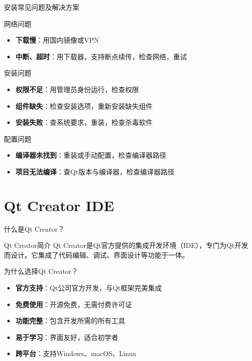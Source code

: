 \documentclass[UTF8,aspectratio=169]{beamer}
\begin{document}
\begin{frame}{安装常见问题及解决方案}
    \begin{ytualertblock}{网络问题}
        \begin{itemize}
            \item \textbf{下载慢}：用国内镜像或VPN
            \item \textbf{中断、超时}：用下载器，支持断点续传，检查网络，重试
        \end{itemize}
    \end{ytualertblock}
    \begin{ytualertblock}{安装问题}
        \begin{itemize}
            \item \textbf{权限不足}：用管理员身份运行，检查权限
            \item \textbf{组件缺失}：检查安装选项，重新安装缺失组件
            \item \textbf{安装失败}：查系统要求，重装，检查杀毒软件
        \end{itemize}
    \end{ytualertblock}
    \begin{ytualertblock}{配置问题}
        \begin{itemize}
            \item \textbf{编译器未找到}：重装或手动配置，检查编译器路径
            \item \textbf{项目无法编译}：查Qt版本与编译器，检查编译器路径
        \end{itemize}
    \end{ytualertblock}
\end{frame}

\section{Qt Creator IDE}

\begin{frame}{什么是Qt Creator？}
    \begin{ytublock}{Qt Creator简介}
        Qt Creator是Qt官方提供的集成开发环境（IDE），专门为Qt开发而设计。它集成了代码编辑、调试、界面设计等功能于一体。
    \end{ytublock}

    \begin{ytublock}{为什么选择Qt Creator？}
        \begin{itemize}
            \item \textbf{官方支持}：Qt公司官方开发，与Qt框架完美集成
            \item \textbf{免费使用}：开源免费，无需付费许可证
            \item \textbf{功能完整}：包含开发所需的所有工具
            \item \textbf{易于学习}：界面友好，适合初学者
            \item \textbf{跨平台}：支持Windows、macOS、Linux
        \end{itemize}
    \end{ytublock}
\end{frame}
\end{document}
